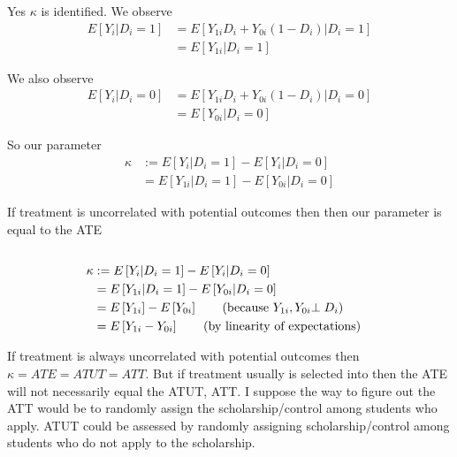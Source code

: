 \documentclass{article}
\begin{document}
\begin{solution}
Yes $\kappa$ is identified. We observe
\begin{align*}
E\left[Y_{i}|D_{i}=1\right] & =E\left[Y_{1i}D_{i}+Y_{0i}\left(1-D_{i}\right)|D_{i}=1\right]\\
 & =E\left[Y_{1i}|D_{i}=1\right]
\end{align*}

We also observe
\begin{align*}
E\left[Y_{i}|D_{i}=0\right] & =E\left[Y_{1i}D_{i}+Y_{0i}\left(1-D_{i}\right)|D_{i}=0\right]\\
 & =E\left[Y_{0i}|D_{i}=0\right]
\end{align*}

So our parameter
\begin{align*}
\kappa & :=E\left[Y_{i}|D_{i}=1\right]-E\left[Y_{i}|D_{i}=0\right]\\
 & =E\left[Y_{1i}|D_{i}=1\right]-E\left[Y_{0i}|D_{i}=0\right]
\end{align*}

If treatment is uncorrelated with potential outcomes then then our
parameter is equal to the ATE
\begin{align*}
\\
\kappa & :=E\left[Y_{i}|D_{i}=1\right]-E\left[Y_{i}|D_{i}=0\right]\\
 & =E\left[Y_{1i}|D_{i}=1\right]-E\left[Y_{0i}|D_{i}=0\right]\\
 & =E\left[Y_{1i}\right]-E\left[Y_{0i}\right]\tag{\text{because \ensuremath{Y_{1i},Y_{0i}}\ensuremath{\perp D_{i}}}}\\
 & =E\left[Y_{1i}-Y_{0i}\right]\tag{\text{by linearity of expectations}}
\end{align*}

If treatment is always uncorrelated with potential outcomes then $\kappa=ATE=ATUT=ATT$.
But if treatment usually is selected into then the ATE will not necessarily
equal the ATUT, ATT. I suppose the way to figure out the ATT would
be to randomly assign the scholarship/control among students who apply.
ATUT could be assessed by randomly assigning scholarship/control among
students who do not apply to the scholarship. 
\end{solution}
\end{document}
